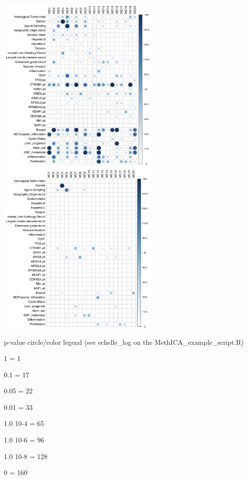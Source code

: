 \documentclass[]{article}
\begin{document}
\includegraphics[width=0.60000\textwidth,height=0.60000\textwidth]{./corrplot_uni.png}
\includegraphics[width=0.60000\textwidth,height=0.60000\textwidth]{./corrplot_multi.png}

p-value circle/color legend (see echelle\_log on the
MethICA\_example\_script.R)

1 = 1

0.1 = 17

0.05 = 22

0.01 = 33

1.0 10-4 = 65

1.0 10-6 = 96

1.0 10-8 = 128

0 = 160
\end{document}
